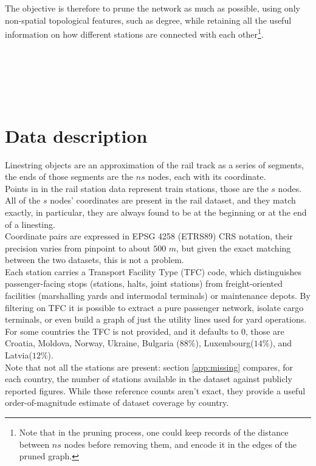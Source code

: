 The objective is therefore to prune the network as much as possible, using only non-spatial topological features, such as degree, while retaining all the useful information on how different stations are connected with each other\footnote{Note that in the pruning process, one could keep records of the distance between $ns$ nodes before removing them, and encode it in the edges of the pruned graph.}.
\\
\\
\\
\\
\\
\\
\section{Data description}
Linestring objects are an approximation of the rail track as a series of segments, the ends of those segments are the $ns$ nodes, each with its coordinate.\\
Points in in the rail station data represent train stations, those are the $s$ nodes.\\
All of the $s$ nodes' coordinates are present in the rail dataset, and they match exactly, in particular, they are always found to be at the beginning or at the end of a linesting.\\

Coordinate pairs are expressed in EPSG 4258 (ETRS89) CRS notation, their precision
varies from pinpoint to about $500 \, \,m$, but given the exact matching between the two datasets, this is not a problem.\\
Each station carries a Transport Facility Type (TFC) code, which distinguishes passenger-facing stops (stations, halts, joint stations) from freight-oriented facilities (marshalling yards and intermodal terminals) or maintenance depots. By filtering on TFC it is possible to extract a pure passenger network, isolate cargo terminals, or even build a graph of just the utility lines used for yard operations.
For some countries the TFC is not provided, and it defaults to $0$, those are Croatia, Moldova, Norway, Ukraine, Bulgaria ($88\%$), Luxembourg($14\%$), and Latvia($12\%$).\\

Note that not all the stations are present: section \ref{app:missing} compares, for each country, the number of stations available in the dataset against publicly reported figures. While these reference counts aren’t exact, they provide a useful order-of-magnitude estimate of dataset coverage by country.


